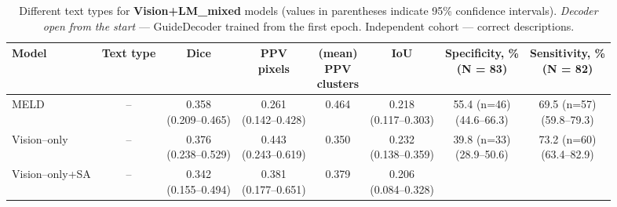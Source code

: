 \documentclass[FCD_GNN.tex]{subfiles}
\begin{document}
\begin{table}[H]
    \centering
    \tiny
    \caption{Different text types for \textbf{Vision+LM\_mixed} models (values in parentheses indicate 95\% confidence intervals). \emph{Decoder open from the start} — GuideDecoder trained from the first epoch. Independent cohort — correct descriptions.}
    
    \label{tab:independent_cohort_mixed}
    \begin{tabular}{lccccccc}
    \textbf{Model} &
    \textbf{Text type} &
    \textbf{Dice} &
    \makecell{\textbf{PPV}\\\textbf{pixels}} &
    \makecell{\textbf{(mean)} \\\textbf{PPV} \\\textbf{clusters}} & 
    \textbf{IoU} & 
    \makecell{\textbf{Specificity, \%} \\ (N = 83)}&
    \makecell{\textbf{Sensitivity, \%} \\ (N = 82)}\\
    \hline
    MELD & -- &
    \makecell{0.358\\(0.209--0.465)} &
    \makecell{0.261\\(0.142--0.428)} &
    0.464 &
    \makecell{0.218\\(0.117--0.303)} &
    \makecell{55.4 (n=46) \\ (44.6--66.3)} & 
    \makecell{\colorbox{orange!15}{69.5 (n=57)} \\ (59.8--79.3)} \\
    \hline
    Vision--only & -- &
    \makecell{0.376\\(0.238--0.529)} &
    \makecell{\colorbox{orange!15}{0.443}\\(0.243--0.619)} &
    0.350 &
    \makecell{0.232\\(0.138--0.359)} &
    \makecell{39.8 (n=33) \\ (28.9--50.6)} &
    \makecell{\colorbox{green!15}{73.2 (n=60)} \\ (63.4--82.9)} \\
    \hline
    Vision--only+SA & -- &
    \makecell{0.342\\ (0.155--0.494)} &
    \makecell{0.381\\ (0.177--0.651)} &
    0.379 &
    \makecell{0.206\\ (0.084--0.328)} &

\end{tabular}
\end{table}
\end{document}
